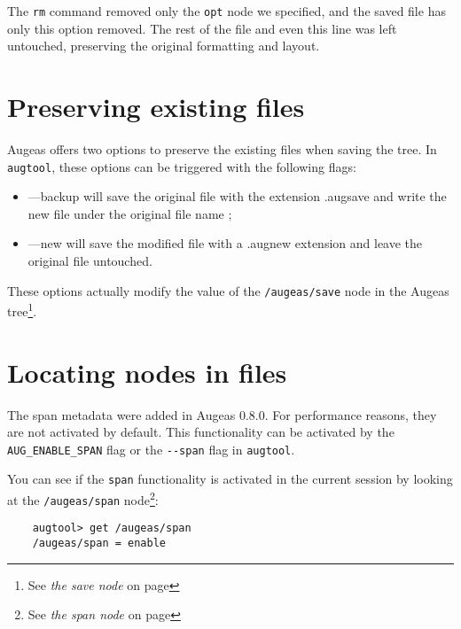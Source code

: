 The \verb!rm! command removed only the \verb!opt! node we specified, and the saved file has only this option removed. The rest of the file and even this line was left untouched, preserving the original formatting and layout.

\section{Preserving existing files}

  

Augeas offers two options to preserve the existing files when saving the tree. In \verb!augtool!, these options can be triggered with the following flags:

\begin{itemize}
\item
  ---backup will save the original file with the extension .augsave and write the new file under the original file name ;
\item
  ---new will save the modified file with a .augnew extension and leave the original file untouched.
\end{itemize}
These options actually modify the value of the \verb!/augeas/save! node in the Augeas tree\footnote{See \emph{the save node} on page \pageref{sec:save_node}}.

\section{Locating nodes in files}

\label{sec:locating_nodes}  

The span metadata were added in Augeas 0.8.0. For performance reasons, they are not activated by default. This functionality can be activated by the \verb!AUG_ENABLE_SPAN! flag or the \verb!--span! flag in \verb!augtool!.

You can see if the \verb!span! functionality is activated in the current session by looking at the \verb!/augeas/span! node\footnote{See \emph{the span node} on page \pageref{sec:span_node}}:


\begin{verbatim}
    augtool> get /augeas/span
    /augeas/span = enable
\end{verbatim}

